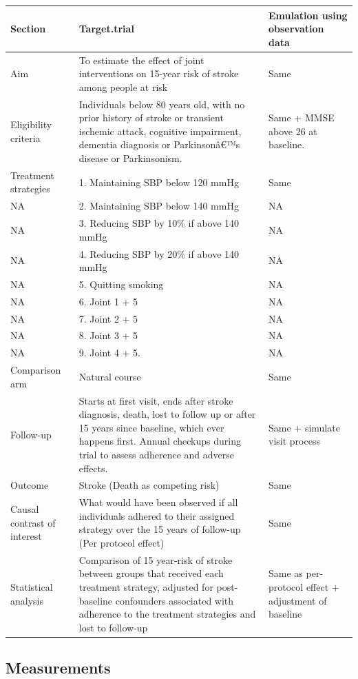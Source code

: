 \documentclass[
]{book}
\begin{document}
\captionsetup[table]{labelformat=empty,skip=1pt}
\begin{longtable}{lll}
\toprule
Section & Target.trial & Emulation using observation data \\ 
\midrule
Aim & To estimate the effect of joint interventions on 15-year risk of stroke among people at risk & Same \\ 
Eligibility criteria & Individuals below 80 years old, with no prior history of stroke or transient ischemic attack, cognitive impairment, dementia diagnosis or Parkinsonâ€™s disease or Parkinsonism. & Same  + MMSE above 26 at baseline. \\ 
Treatment strategies & 1. Maintaining SBP below 120 mmHg & Same \\ 
NA & 2. Maintaining SBP below 140 mmHg & NA \\ 
NA & 3. Reducing SBP by 10\% if above 140 mmHg & NA \\ 
NA & 4. Reducing SBP by 20\% if above 140 mmHg & NA \\ 
NA & 5. Quitting smoking & NA \\ 
NA & 6. Joint 1 + 5 & NA \\ 
NA & 7. Joint 2 + 5 & NA \\ 
NA & 8. Joint 3 + 5 & NA \\ 
NA & 9. Joint 4 + 5. & NA \\ 
Comparison arm & Natural course & Same \\ 
Follow-up & Starts at first visit, ends after stroke diagnosis, death, lost to follow up or after 15 years since baseline, which ever happens first. Annual checkups during trial to assess adherence and adverse effects. & Same + simulate visit process \\ 
Outcome & Stroke (Death as competing risk) & Same \\ 
Causal contrast of interest & What would have been observed if all individuals adhered to their assigned strategy over the 15 years of follow-up (Per protocol effect) & Same \\ 
Statistical analysis & Comparison of 15 year-risk of stroke between groups that received each treatment strategy, adjusted for post-baseline confounders associated with adherence to the treatment strategies and lost to follow-up & Same as per-protocol effect + adjustment of baseline \\ 
\bottomrule
\end{longtable}
\newpage

\hypertarget{measurements}{%
\subsection{Measurements}\label{measurements}}
\end{document}
